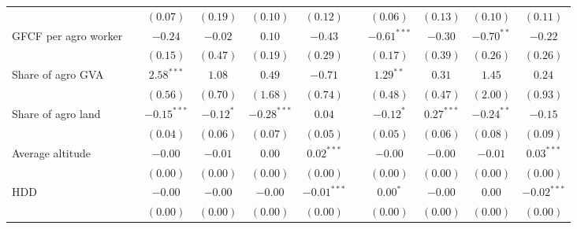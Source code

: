 \begin{table}
\begin{center}
\begin{tabular}{l c c c c c c c c c c}
                                  &               & $(0.07)$      & $(0.19)$       & $(0.10)$       & $(0.12)$      &               & $(0.06)$      & $(0.13)$      & $(0.10)$      & $(0.11)$      \\
GFCF per agro worker              &               & $-0.24$       & $-0.02$        & $0.10$         & $-0.43$       &               & $-0.61^{***}$ & $-0.30$       & $-0.70^{**}$  & $-0.22$       \\
                                  &               & $(0.15)$      & $(0.47)$       & $(0.19)$       & $(0.29)$      &               & $(0.17)$      & $(0.39)$      & $(0.26)$      & $(0.26)$      \\
Share of agro GVA                 &               & $2.58^{***}$  & $1.08$         & $0.49$         & $-0.71$       &               & $1.29^{**}$   & $0.31$        & $1.45$        & $0.24$        \\
                                  &               & $(0.56)$      & $(0.70)$       & $(1.68)$       & $(0.74)$      &               & $(0.48)$      & $(0.47)$      & $(2.00)$      & $(0.93)$      \\
Share of agro land                &               & $-0.15^{***}$ & $-0.12^{*}$    & $-0.28^{***}$  & $0.04$        &               & $-0.12^{*}$   & $0.27^{***}$  & $-0.24^{**}$  & $-0.15$       \\
                                  &               & $(0.04)$      & $(0.06)$       & $(0.07)$       & $(0.05)$      &               & $(0.05)$      & $(0.06)$      & $(0.08)$      & $(0.09)$      \\
Average altitude                  &               & $-0.00$       & $-0.01$        & $0.00$         & $0.02^{***}$  &               & $-0.00$       & $-0.00$       & $-0.01$       & $0.03^{***}$  \\
                                  &               & $(0.00)$      & $(0.00)$       & $(0.00)$       & $(0.00)$      &               & $(0.00)$      & $(0.00)$      & $(0.00)$      & $(0.00)$      \\
HDD                               &               & $-0.00$       & $-0.00$        & $-0.00$        & $-0.01^{***}$ &               & $0.00^{*}$    & $-0.00$       & $0.00$        & $-0.02^{***}$ \\
                                  &               & $(0.00)$      & $(0.00)$       & $(0.00)$       & $(0.00)$      &               & $(0.00)$      & $(0.00)$      & $(0.00)$      & $(0.00)$      \\

\end{tabular}
\end{center}
\end{table}
